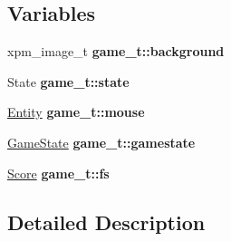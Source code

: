 \subsection*{Variables}
\begin{DoxyCompactItemize}
\item 
\mbox{\label{group__Game_ga948d08118db7ff5e7a68a4125acd2c12}} 
xpm\+\_\+image\+\_\+t {\bfseries game\+\_\+t\+::background}
\item 
\mbox{\label{group__Game_ga395f0736d184a3da9bafe95eaaa10c9e}} 
State {\bfseries game\+\_\+t\+::state}
\item 
\mbox{\label{group__Game_ga7ad2b0dafc55e88ba5d32af039b20a0f}} 
\hyperlink{structentity__t}{Entity} {\bfseries game\+\_\+t\+::mouse}
\item 
\mbox{\label{group__Game_ga1261af6a947b5f4152cd04da265d4038}} 
\hyperlink{structgamestate__t}{Game\+State} {\bfseries game\+\_\+t\+::gamestate}
\item 
\mbox{\label{group__Game_gad170d146aef2d44454d1567cd80eb899}} 
\hyperlink{structscore__t}{Score} {\bfseries game\+\_\+t\+::fs}
\end{DoxyCompactItemize}


\subsection{Detailed Description}
